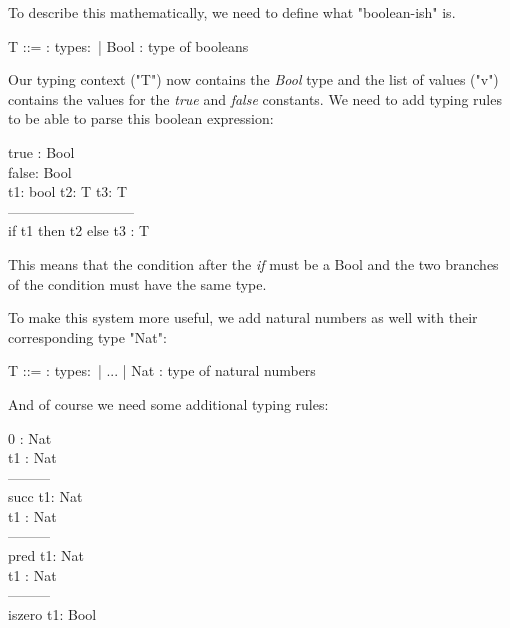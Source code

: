 To describe this mathematically, we need to define what
"boolean-ish" is.

\begin{bnfgrammar}
    T ::= : types$\colon$
    | Bool : type of booleans
\end{bnfgrammar}

Our typing context ("T") now contains the \textit{Bool} type
and the list of values ("v") contains the values for the
\textit{true} and \textit{false} constants. We need to add
typing rules to be able to parse this boolean expression:

true : Bool\\
false: Bool\\
t1: bool     t2: T    t3: T\\
---------------------------\\
if t1 then t2 else t3 : T

This means that the condition after the \textit{if} must
be a Bool and the two branches of the condition must have
the same type.

To make this system more useful, we add natural numbers
as well with their corresponding type "Nat":

\begin{bnfgrammar}
    T ::= : types$\colon$
    | ...
    | Nat : type of natural numbers
\end{bnfgrammar}

And of course we need some additional typing rules:

0 : Nat\\
t1 : Nat\\
---------\\
succ t1: Nat\\
t1 : Nat\\
---------\\
pred t1: Nat\\
t1 : Nat\\
---------\\
iszero t1: Bool\\




